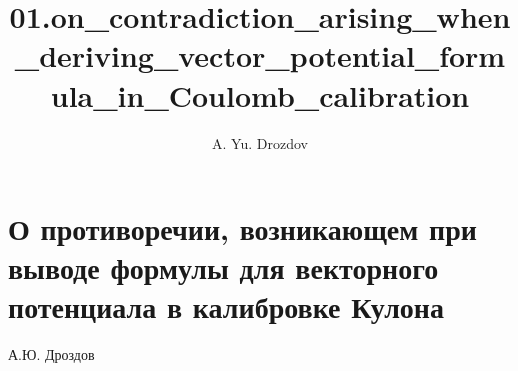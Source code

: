 \documentclass[11pt]{article}
\author{A. Yu. Drozdov}
\title{01.on\_contradiction\_arising\_when\_deriving\_vector\_potential\_formula\_in\_Coulomb\_calibration}
\begin{document}
    
    \maketitle
    
    

    
    \section{О противоречии, возникающем при выводе формулы для векторного
потенциала в калибровке
Кулона}\label{ux43e-ux43fux440ux43eux442ux438ux432ux43eux440ux435ux447ux438ux438-ux432ux43eux437ux43dux438ux43aux430ux44eux449ux435ux43c-ux43fux440ux438-ux432ux44bux432ux43eux434ux435-ux444ux43eux440ux43cux443ux43bux44b-ux434ux43bux44f-ux432ux435ux43aux442ux43eux440ux43dux43eux433ux43e-ux43fux43eux442ux435ux43dux446ux438ux430ux43bux430-ux432-ux43aux430ux43bux438ux431ux440ux43eux432ux43aux435-ux43aux443ux43bux43eux43dux430}

    А.Ю. Дроздов
\end{document}
